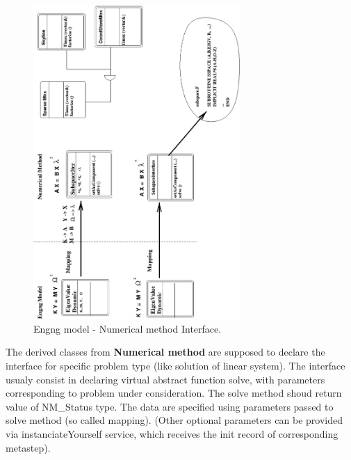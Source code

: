 \documentclass[a4paper]{article}
\newcommand{\class}[1]{{\bf #1}}
\begin{document}
\begin{figure}[tb]
\else
\centerline{\includegraphics[angle=270,width=0.7\textwidth]{engng.eps}}
\fi
\caption{Engng model - Numerical method Interface.}
\label{engngNummet2fig}
\end{figure}







The derived classes from \class{Numerical method} are supposed to
declare the interface for specific problem type
(like solution of linear system). The interface usualy consist in
declaring virtual abstract function solve, with parameters corresponding
to problem under consideration. The solve method shoud return
value of NM\_Status type. The data are specified using parameters passed to solve method (so called
mapping). (Other optional parameters can be provided via instanciateYourself
service, which receives the init record of corresponding metastep).
\end{document}
